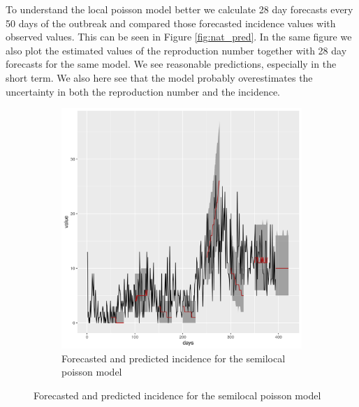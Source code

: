\documentclass[12pt]{article}
\begin{document}
To understand the local poisson model better we calculate 28 day forecasts every 50 days of the outbreak and compared those forecasted incidence values with observed values. This can be seen in Figure \ref{fig:nat_pred}. In the same figure we also plot the estimated values of the reproduction number together with 28 day forecasts for the same model. We see reasonable predictions, especially in the short term. We also here see that the model probably overestimates the uncertainty in both the reproduction number and the incidence. 
\begin{figure}[h]
\begin{subfigure}{\textwidth}
  \centering
  \includegraphics[width=0.9\linewidth]{../output/national_predictions.png}  
  \caption{Forecasted and predicted incidence for the semilocal poisson model}
  \label{fig:sub-first}
\end{subfigure}


\end{figure}
\end{document}

